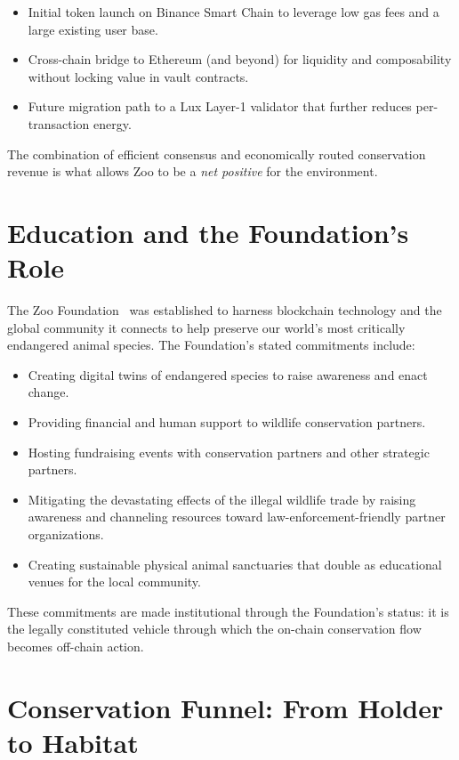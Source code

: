 \documentclass[11pt,letterpaper]{article}
\begin{document}
\begin{itemize}
  \item Initial token launch on Binance Smart Chain to leverage low gas fees and a large existing user base.
  \item Cross-chain bridge to Ethereum (and beyond) for liquidity and composability without locking value in vault contracts.
  \item Future migration path to a Lux Layer-1 validator that further reduces per-transaction energy.
\end{itemize}

The combination of efficient consensus and economically routed conservation revenue is what allows Zoo to be a \emph{net positive} for the environment.

\section{Education and the Foundation's Role}

The Zoo Foundation~\cite{zoo2021} was established to harness blockchain technology and the global community it connects to help preserve our world's most critically endangered animal species. The Foundation's stated commitments include:

\begin{itemize}
  \item Creating digital twins of endangered species to raise awareness and enact change.
  \item Providing financial and human support to wildlife conservation partners.
  \item Hosting fundraising events with conservation partners and other strategic partners.
  \item Mitigating the devastating effects of the illegal wildlife trade by raising awareness and channeling resources toward law-enforcement-friendly partner organizations.
  \item Creating sustainable physical animal sanctuaries that double as educational venues for the local community.
\end{itemize}

These commitments are made institutional through the Foundation's status: it is the legally constituted vehicle through which the on-chain conservation flow becomes off-chain action.

\section{Conservation Funnel: From Holder to Habitat}
\end{document}
